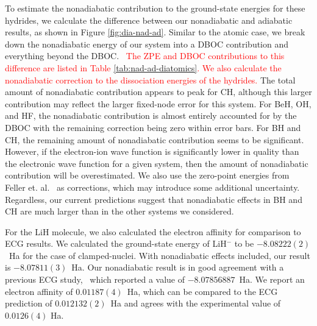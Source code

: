 \documentclass[aip,jcp,numerical,reprint]{revtex4-1}
\begin{document}
To estimate the nonadiabatic contribution to the ground-state energies for these hydrides, we calculate the difference between our nonadiabatic and adiabatic results, as shown in Figure \ref{fig:dia-nad-ad}. Similar to the atomic case, we break down the nonadiabatic energy of our system into a DBOC contribution and everything beyond the DBOC.~\cite{CFOUR,Harding,Feller_DBOC} \textcolor{red}{The ZPE and DBOC contributions to this difference are listed in Table \ref{tab:nad-ad-diatomics}. We also calculate the nonadiabatic correction to the dissociation energies of the hydrides.} The total amount of nonadiabatic contribution appears to peak for CH, although this larger contribution may reflect the larger fixed-node error for this system. For BeH, OH, and HF, the nonadiabatic contribution is almost entirely accounted for by the DBOC with the remaining correction being zero within error bars. For BH and CH, the remaining amount of nonadiabatic contribution seems to be significant. However, if the electron-ion wave function is significantly lower in quality than the electronic wave function for a given system, then the amount of nonadiabatic contribution will be overestimated. We also use the zero-point energies from Feller et. al.~\cite{Feller_Corrections} as corrections, which may introduce some additional uncertainty.  Regardless, our current predictions suggest that nonadiabatic effects in BH and CH are much larger than in the other systems we considered.

For the LiH molecule, we also calculated the electron affinity for comparison to ECG results. We calculated the ground-state energy of LiH$^-$ to be $-8.08222(2)$~Ha for the case of clamped-nuclei. With nonadiabatic effects included, our result is  $-8.07811(3)$~Ha. Our nonadiabatic result is in good agreement with a previous ECG study,~\cite{Bubin_LiH-_noBO} which reported a value of $-8.07856887$~Ha. We report an electron affinity of $0.01187(4)$~Ha, which can be compared to the ECG prediction of $0.012132(2)$~Ha and agrees with the experimental value of $0.0126(4)$ Ha.~\cite{switch}
\end{document}
